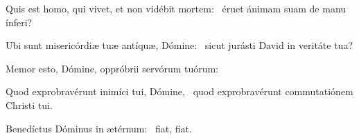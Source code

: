 \item Quis est homo, qui vivet, et non vidébit mortem:~\psstar{} éruet ánimam suam de manu ínferi?

\item Ubi sunt misericórdiæ tuæ antíquæ, Dómine:~\psstar{} sicut jurásti David in veritáte tua?

\item Memor esto, Dómine, oppróbrii servórum tuórum:~\psstar{}

\item Quod exprobravérunt inimíci tui, Dómine,~\psstar{} quod exprobravérunt commutatiónem Christi tui.

\item Benedíctus Dóminus in ætérnum:~\psstar{} fiat, fiat.

